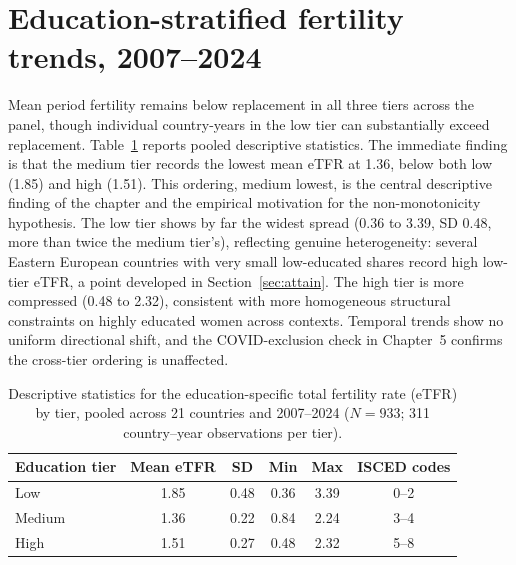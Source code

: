 \documentclass[12pt,a4paper]{report}
\begin{document}
\section{Education-stratified fertility trends, 2007--2024}
Mean period fertility remains below replacement in all three tiers across the panel, though
individual country-years in the low tier can substantially exceed replacement.
Table~\ref{tab:etfr} reports pooled descriptive statistics. The immediate finding is that the
medium tier records the lowest mean eTFR at 1.36, below both low (1.85) and high (1.51). This
ordering, medium lowest, is the central descriptive finding of the chapter and the empirical
motivation for the non-monotonicity hypothesis. The low tier shows by far the widest spread
(0.36 to 3.39, SD 0.48, more than twice the medium tier's), reflecting genuine heterogeneity:
several Eastern European countries with very small
low-educated shares record high low-tier eTFR, a point developed in Section~\ref{sec:attain}. The
high tier is more compressed (0.48 to 2.32), consistent with more homogeneous structural
constraints on highly educated women across contexts. Temporal trends show no uniform directional shift, and the COVID-exclusion check in Chapter~5 confirms
the cross-tier ordering is unaffected.

\begin{table}[ht]
\centering
\caption{Descriptive statistics for the education-specific total fertility rate (eTFR) by tier, pooled across 21 countries and 2007--2024 ($N=933$; 311 country--year observations per tier).}
\label{tab:etfr}
\begin{tabular}{@{}lccccc@{}}
\toprule
Education tier & Mean eTFR & SD & Min & Max & ISCED codes \\
\midrule
Low    & 1.85 & 0.48 & 0.36 & 3.39 & 0--2 \\
Medium & 1.36 & 0.22 & 0.84 & 2.24 & 3--4 \\
High   & 1.51 & 0.27 & 0.48 & 2.32 & 5--8 \\
\bottomrule
\end{tabular}
\end{table}
\end{document}
